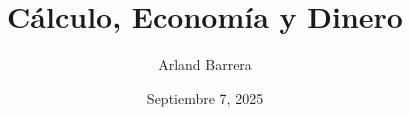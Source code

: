 \documentclass{extbook}
\title{Cálculo, Economía y Dinero}
\author{Arland Barrera}
\date{Septiembre 7, 2025}
\begin{document}
\maketitle

\tableofcontents


\expandafter\itincap\expandafter{\temas}


% 
% 
\end{document}
